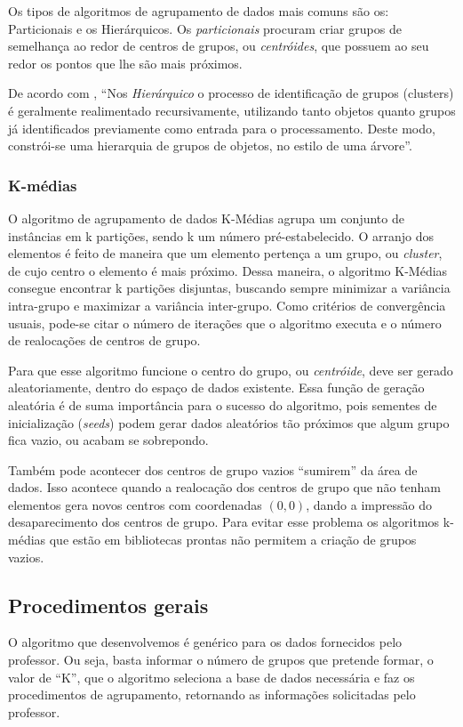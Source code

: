\documentclass[12pt, a4paper]{article}
\begin{document}
Os tipos de algoritmos de agrupamento de dados mais comuns são os: Particionais e os Hierárquicos. Os \emph{particionais} procuram criar grupos de semelhança ao redor de centros de grupos, ou \emph{centróides}, que possuem ao seu redor os pontos que lhe são mais próximos.

De acordo com \citep{hierarquico}, ``Nos \emph{Hierárquico} o processo de identificação de grupos (clusters) é geralmente realimentado recursivamente, utilizando tanto objetos quanto grupos já identificados previamente como entrada para o processamento. Deste modo, constrói-se uma hierarquia de grupos de objetos, no estilo de uma árvore''.

\subsubsection{K-médias}
O algoritmo de agrupamento de dados K-Médias agrupa um conjunto de instâncias
em k partições, sendo k um número pré-estabelecido. O arranjo dos elementos é feito de maneira
que um elemento pertença a um grupo, ou \emph{cluster}, de cujo centro o elemento é mais próximo.
Dessa maneira, o algoritmo K-Médias consegue encontrar k partições disjuntas, buscando sempre
minimizar a variância intra-grupo e maximizar a variância inter-grupo. Como critérios de
convergência usuais, pode-se citar o número de iterações que o algoritmo executa e o número de
realocações de centros de grupo.

Para que esse algoritmo funcione o centro do grupo, ou \textit{centróide},  deve ser gerado aleatoriamente, dentro do espaço de dados existente. Essa função de geração aleatória é de suma importância para o sucesso do algoritmo, pois sementes de inicialização (\emph{seeds}) podem gerar dados aleatórios tão próximos que algum grupo fica vazio, ou acabam se sobrepondo.

Também pode acontecer dos centros de grupo vazios ``sumirem'' da área de dados. Isso acontece quando a realocação dos centros de grupo que não tenham elementos gera novos centros com coordenadas $(0, 0)$, dando a impressão do desaparecimento dos centros de grupo. Para evitar esse problema os algoritmos k-médias que estão em bibliotecas prontas não permitem a criação de grupos vazios.

\subsection{Procedimentos gerais}
O algoritmo que desenvolvemos é genérico para os dados fornecidos pelo professor. Ou seja, basta informar o número de grupos que pretende formar, o valor de ``K'', que o algoritmo seleciona a base de dados necessária e faz os procedimentos de agrupamento, retornando as informações solicitadas pelo professor.
\end{document}
